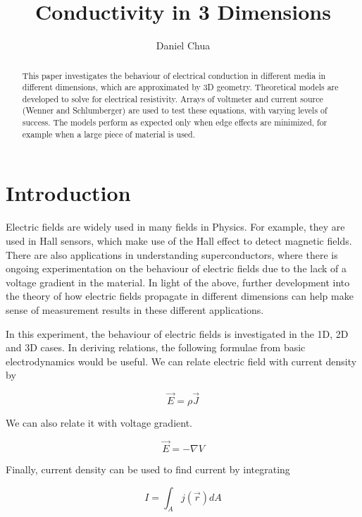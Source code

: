 \documentclass[12pt]{IEEEtran}
\title{Conductivity in 3 Dimensions}
\author{Daniel Chua}
\begin{document}
\maketitle

\begin{abstract}
This paper investigates the behaviour of electrical conduction in different media in different dimensions, which are approximated by 3D geometry. Theoretical models are developed to solve for electrical resistivity. Arrays of voltmeter and current source (Wenner and Schlumberger) are used to test these equations, with varying levels of success. The models perform as expected only when edge effects are minimized, for example when a large piece of material is used.
\end{abstract}

\section{Introduction}

Electric fields are widely used in many fields in Physics. For example, they are used in Hall sensors, which make use of the Hall effect to detect magnetic fields. There are also applications in understanding superconductors, where there is ongoing experimentation on the behaviour of electric fields due to the lack of a voltage gradient in the material. In light of the above, further development into the theory of how electric fields propagate in different dimensions can help make sense of measurement results in these different applications.

In this experiment, the behaviour of electric fields is investigated in the 1D, 2D and 3D cases. In deriving relations, the following formulae from basic electrodynamics would be useful. We can relate electric field with current density by

\begin{equation} \label{current}
    \vec E = \rho \vec J
\end{equation}

We can also relate it with voltage gradient.

\begin{equation} \label{voltage}
    \vec E = -\nabla V
\end{equation}

Finally, current density can be used to find current by integrating

\begin{equation} \label{density}
    I = \int_A j(\vec r) dA
\end{equation}
\end{document}
